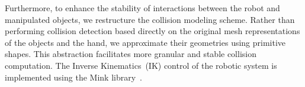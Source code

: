Furthermore, to enhance the stability of interactions between the robot and manipulated objects, we restructure the collision modeling scheme. Rather than performing collision detection based directly on the original mesh representations of the objects and the hand, we approximate their geometries using primitive shapes. This abstraction facilitates more granular and stable collision computation. The Inverse Kinematics~(IK) control of the robotic system is implemented using the Mink library~\cite{ZakkaMink2025}. 






